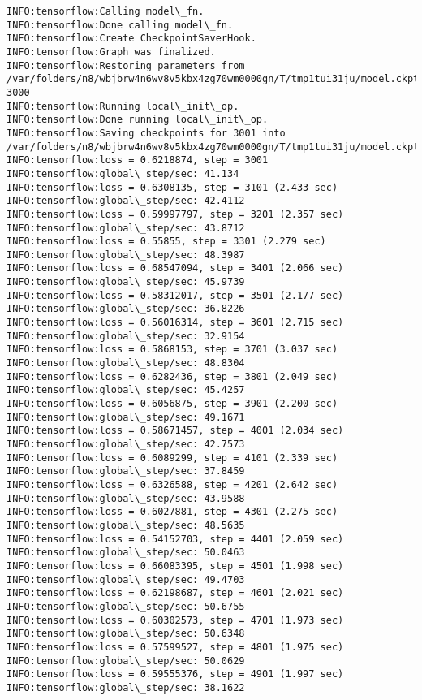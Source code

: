 \documentclass[11pt]{article}
\begin{document}
    \begin{Verbatim}[commandchars=\\\{\}]
INFO:tensorflow:Calling model\_fn.
INFO:tensorflow:Done calling model\_fn.
INFO:tensorflow:Create CheckpointSaverHook.
INFO:tensorflow:Graph was finalized.
INFO:tensorflow:Restoring parameters from /var/folders/n8/wbjbrw4n6wv8v5kbx4zg70wm0000gn/T/tmp1tui31ju/model.ckpt-3000
INFO:tensorflow:Running local\_init\_op.
INFO:tensorflow:Done running local\_init\_op.
INFO:tensorflow:Saving checkpoints for 3001 into /var/folders/n8/wbjbrw4n6wv8v5kbx4zg70wm0000gn/T/tmp1tui31ju/model.ckpt.
INFO:tensorflow:loss = 0.6218874, step = 3001
INFO:tensorflow:global\_step/sec: 41.134
INFO:tensorflow:loss = 0.6308135, step = 3101 (2.433 sec)
INFO:tensorflow:global\_step/sec: 42.4112
INFO:tensorflow:loss = 0.59997797, step = 3201 (2.357 sec)
INFO:tensorflow:global\_step/sec: 43.8712
INFO:tensorflow:loss = 0.55855, step = 3301 (2.279 sec)
INFO:tensorflow:global\_step/sec: 48.3987
INFO:tensorflow:loss = 0.68547094, step = 3401 (2.066 sec)
INFO:tensorflow:global\_step/sec: 45.9739
INFO:tensorflow:loss = 0.58312017, step = 3501 (2.177 sec)
INFO:tensorflow:global\_step/sec: 36.8226
INFO:tensorflow:loss = 0.56016314, step = 3601 (2.715 sec)
INFO:tensorflow:global\_step/sec: 32.9154
INFO:tensorflow:loss = 0.5868153, step = 3701 (3.037 sec)
INFO:tensorflow:global\_step/sec: 48.8304
INFO:tensorflow:loss = 0.6282436, step = 3801 (2.049 sec)
INFO:tensorflow:global\_step/sec: 45.4257
INFO:tensorflow:loss = 0.6056875, step = 3901 (2.200 sec)
INFO:tensorflow:global\_step/sec: 49.1671
INFO:tensorflow:loss = 0.58671457, step = 4001 (2.034 sec)
INFO:tensorflow:global\_step/sec: 42.7573
INFO:tensorflow:loss = 0.6089299, step = 4101 (2.339 sec)
INFO:tensorflow:global\_step/sec: 37.8459
INFO:tensorflow:loss = 0.6326588, step = 4201 (2.642 sec)
INFO:tensorflow:global\_step/sec: 43.9588
INFO:tensorflow:loss = 0.6027881, step = 4301 (2.275 sec)
INFO:tensorflow:global\_step/sec: 48.5635
INFO:tensorflow:loss = 0.54152703, step = 4401 (2.059 sec)
INFO:tensorflow:global\_step/sec: 50.0463
INFO:tensorflow:loss = 0.66083395, step = 4501 (1.998 sec)
INFO:tensorflow:global\_step/sec: 49.4703
INFO:tensorflow:loss = 0.62198687, step = 4601 (2.021 sec)
INFO:tensorflow:global\_step/sec: 50.6755
INFO:tensorflow:loss = 0.60302573, step = 4701 (1.973 sec)
INFO:tensorflow:global\_step/sec: 50.6348
INFO:tensorflow:loss = 0.57599527, step = 4801 (1.975 sec)
INFO:tensorflow:global\_step/sec: 50.0629
INFO:tensorflow:loss = 0.59555376, step = 4901 (1.997 sec)
INFO:tensorflow:global\_step/sec: 38.1622

\end{Verbatim}
\end{document}
